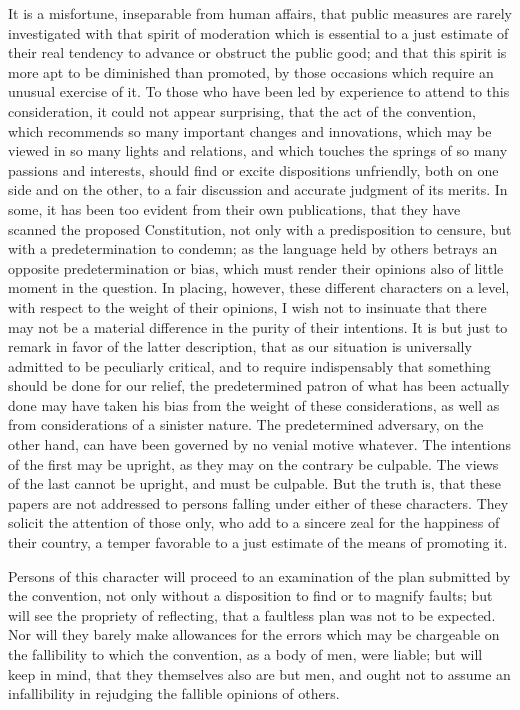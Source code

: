 It is a misfortune, inseparable from human affairs, that public measures are rarely investigated with that spirit of moderation which is essential to a just estimate of their real tendency to advance or obstruct the public good; and that this spirit is more apt to be diminished than promoted, by those occasions which require an unusual exercise of it. 
To those who have been led by experience to attend to this consideration, it could not appear surprising, that the act of the convention, which recommends so many important changes and innovations, which may be viewed in so many lights and relations, and which touches the springs of so many passions and interests, should find or excite dispositions unfriendly, both on one side and on the other, to a fair discussion and accurate judgment of its merits. 
In some, it has been too evident from their own publications, that they have scanned the proposed Constitution, not only with a predisposition to censure, but with a predetermination to condemn; as the language held by others betrays an opposite predetermination or bias, which must render their opinions also of little moment in the question. 
In placing, however, these different characters on a level, with respect to the weight of their opinions, I wish not to insinuate that there may not be a material difference in the purity of their intentions. 
It is but just to remark in favor of the latter description, that as our situation is universally admitted to be peculiarly critical, and to require indispensably that something should be done for our relief, the predetermined patron of what has been actually done may have taken his bias from the weight of these considerations, as well as from considerations of a sinister nature. 
The predetermined adversary, on the other hand, can have been governed by no venial motive whatever. 
The intentions of the first may be upright, as they may on the contrary be culpable. 
The views of the last cannot be upright, and must be culpable. 
But the truth is, that these papers are not addressed to persons falling under either of these characters. 
They solicit the attention of those only, who add to a sincere zeal for the happiness of their country, a temper favorable to a just estimate of the means of promoting it.

Persons of this character will proceed to an examination of the plan submitted by the convention, not only without a disposition to find or to magnify faults; but will see the propriety of reflecting, that a faultless plan was not to be expected. 
Nor will they barely make allowances for the errors which may be chargeable on the fallibility to which the convention, as a body of men, were liable; but will keep in mind, that they themselves also are but men, and ought not to assume an infallibility in rejudging the fallible opinions of others.

